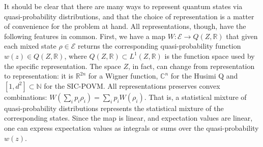 \documentclass[10pt,twocolumn, nofootinbib]{revtex4-2}
\newcommand{\Ens}[1][E] {\mathcal{#1}} %
\begin{document}
It should be clear that there are many ways to represent quantum states via quasi-probability distributions, and that the choice of representation is a matter of convenience for the problem at hand. All representations, though, have the following features in common. First, we have a map $W : \Ens \to Q(Z,\mathbb{R})$ that given each mixed state $\rho \in \Ens$ returns the corresponding quasi-probability function $w(z) \in Q(Z,\mathbb{R})$, where $Q(Z,\mathbb{R}) \subset L^1(Z,\mathbb{R})$ is the function space used by the specific representation. The space $Z$, in fact, can change from representation to representation: it is $\mathbb{R}^{2n}$ for a Wigner function, $\mathbb{C}^n$ for the Husimi Q and $[1, d^2] \subset \mathbb{N}$ for the SIC-POVM. All representations preserves convex combinations: $W(\sum_i p_i \rho_i) = \sum_i p_i W(\rho_i)$. That is, a statistical mixture of quasi-probability distributions represents the statistical mixture of the corresponding states. Since the map is linear, and expectation values are linear, one can express expectation values as integrals or sums over the quasi-probability $w(z)$. 
\end{document}
